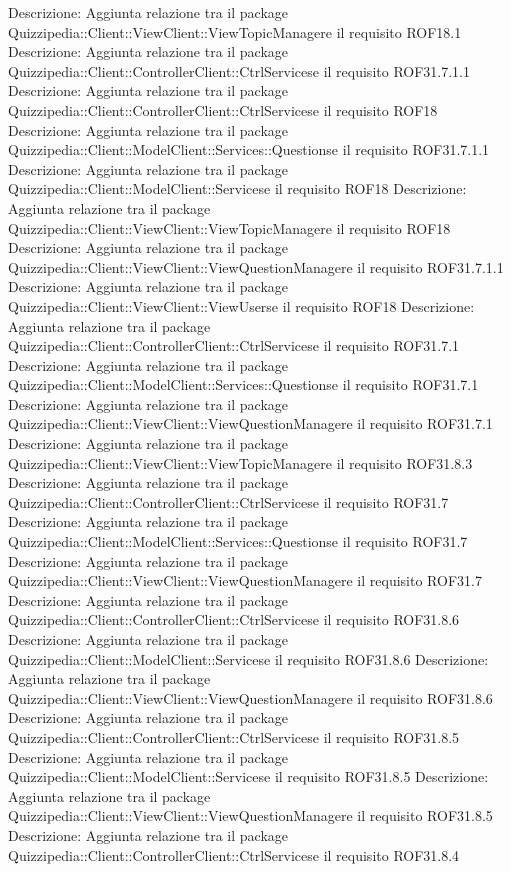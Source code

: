 Descrizione: Aggiunta relazione tra il package Quizzipedia::Client::ViewClient::ViewTopicManagere il requisito ROF18.1 
Descrizione: Aggiunta relazione tra il package Quizzipedia::Client::ControllerClient::CtrlServicese il requisito ROF31.7.1.1 
Descrizione: Aggiunta relazione tra il package Quizzipedia::Client::ControllerClient::CtrlServicese il requisito ROF18 
Descrizione: Aggiunta relazione tra il package Quizzipedia::Client::ModelClient::Services::Questionse il requisito ROF31.7.1.1 
Descrizione: Aggiunta relazione tra il package Quizzipedia::Client::ModelClient::Servicese il requisito ROF18 
Descrizione: Aggiunta relazione tra il package Quizzipedia::Client::ViewClient::ViewTopicManagere il requisito ROF18 
Descrizione: Aggiunta relazione tra il package Quizzipedia::Client::ViewClient::ViewQuestionManagere il requisito ROF31.7.1.1 
Descrizione: Aggiunta relazione tra il package Quizzipedia::Client::ViewClient::ViewUserse il requisito ROF18 
Descrizione: Aggiunta relazione tra il package Quizzipedia::Client::ControllerClient::CtrlServicese il requisito ROF31.7.1 
Descrizione: Aggiunta relazione tra il package Quizzipedia::Client::ModelClient::Services::Questionse il requisito ROF31.7.1 
Descrizione: Aggiunta relazione tra il package Quizzipedia::Client::ViewClient::ViewQuestionManagere il requisito ROF31.7.1 
Descrizione: Aggiunta relazione tra il package Quizzipedia::Client::ViewClient::ViewTopicManagere il requisito ROF31.8.3 
Descrizione: Aggiunta relazione tra il package Quizzipedia::Client::ControllerClient::CtrlServicese il requisito ROF31.7 
Descrizione: Aggiunta relazione tra il package Quizzipedia::Client::ModelClient::Services::Questionse il requisito ROF31.7 
Descrizione: Aggiunta relazione tra il package Quizzipedia::Client::ViewClient::ViewQuestionManagere il requisito ROF31.7 
Descrizione: Aggiunta relazione tra il package Quizzipedia::Client::ControllerClient::CtrlServicese il requisito ROF31.8.6 
Descrizione: Aggiunta relazione tra il package Quizzipedia::Client::ModelClient::Servicese il requisito ROF31.8.6 
Descrizione: Aggiunta relazione tra il package Quizzipedia::Client::ViewClient::ViewQuestionManagere il requisito ROF31.8.6 
Descrizione: Aggiunta relazione tra il package Quizzipedia::Client::ControllerClient::CtrlServicese il requisito ROF31.8.5 
Descrizione: Aggiunta relazione tra il package Quizzipedia::Client::ModelClient::Servicese il requisito ROF31.8.5 
Descrizione: Aggiunta relazione tra il package Quizzipedia::Client::ViewClient::ViewQuestionManagere il requisito ROF31.8.5 
Descrizione: Aggiunta relazione tra il package Quizzipedia::Client::ControllerClient::CtrlServicese il requisito ROF31.8.4 
